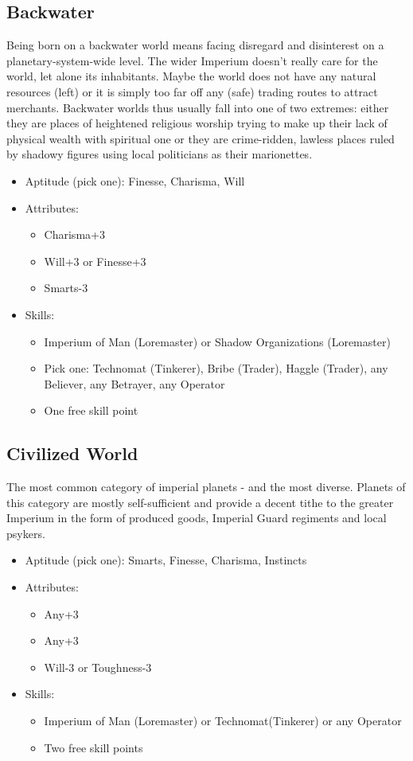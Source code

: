\subsection{Backwater}
Being born on a backwater world means facing disregard and disinterest on a planetary-system-wide level. The wider Imperium doesn't really care for the world, let alone its inhabitants. Maybe the world does not have any natural resources (left) or it is simply too far off any (safe) trading routes to attract merchants. Backwater worlds thus usually fall into one of two extremes: either they are places of heightened religious worship trying to make up their lack of physical wealth with spiritual one or they are crime-ridden, lawless places ruled by shadowy figures using local politicians as their marionettes. 

\begin{itemize}
	\item Aptitude (pick one): Finesse, Charisma, Will
	\item Attributes:
	\begin{itemize}
		\item Charisma+3
		\item Will+3 or Finesse+3
		\item Smarts-3
	\end{itemize}
	\item Skills: 
	\begin{itemize}
	 	\item Imperium of Man (Loremaster) or Shadow Organizations (Loremaster)
	 	\item Pick one: Technomat (Tinkerer), Bribe (Trader), Haggle (Trader), any Believer, any Betrayer, any Operator
	 	\item One free skill point
	 \end{itemize} 
\end{itemize}


\subsection{Civilized World}
The most common category of imperial planets - and the most diverse. Planets of this category are mostly self-sufficient and provide a decent tithe to the greater Imperium in the form of produced goods, Imperial Guard regiments and local psykers.

\begin{itemize}
	\item Aptitude (pick one): Smarts, Finesse, Charisma, Instincts
	\item Attributes:
	\begin{itemize}
		\item Any+3
		\item Any+3
		\item Will-3 or Toughness-3
	\end{itemize}
	\item Skills: 
	\begin{itemize}
	 	\item Imperium of Man (Loremaster) or Technomat(Tinkerer) or any Operator
	 	\item Two free skill points
	 \end{itemize} 
\end{itemize}


